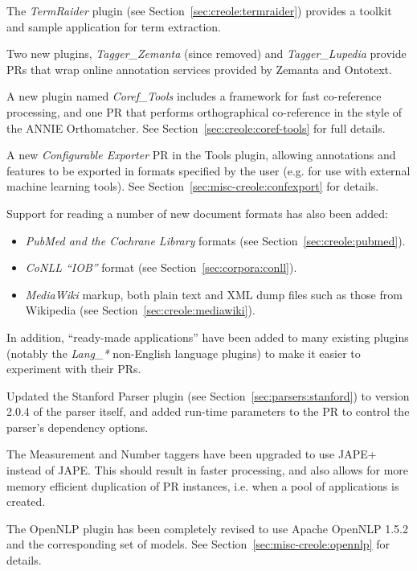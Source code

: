 

The \emph{TermRaider} plugin (see Section~\ref{sec:creole:termraider})
provides a toolkit and sample application for term extraction.

Two new plugins, \emph{Tagger\_Zemanta} (since removed) and
\emph{Tagger\_Lupedia} provide PRs that wrap online annotation services provided
by Zemanta and Ontotext.

A new plugin named \emph{Coref\_Tools} includes a framework for fast
co-reference processing, and one PR that performs orthographical co-reference in
the style of the ANNIE Orthomatcher. See Section~\ref{sec:creole:coref-tools}
for full details.

A new \emph{Configurable Exporter} PR in the Tools plugin, allowing annotations
and features to be exported in formats specified by the user (e.g. for use with
external machine learning tools).  See Section~\ref{sec:misc-creole:confexport}
for details.

Support for reading a number of new document formats has also been added:
\begin{itemize}
\item \emph{PubMed and the Cochrane Library} formats (see
  Section~\ref{sec:creole:pubmed}).
\item \emph{CoNLL ``IOB''} format (see Section~\ref{sec:corpora:conll}).
\item\emph{MediaWiki} markup, both plain text and XML dump files such as those
  from Wikipedia (see Section~\ref{sec:creole:mediawiki}).
\end{itemize}

In addition, ``ready-made applications'' have been added to many existing
plugins (notably the \emph{Lang\_*} non-English language plugins) to make it
easier to experiment with their PRs.


Updated the Stanford Parser plugin (see Section~\ref{sec:parsers:stanford}) to
version 2.0.4 of the parser itself, and added run-time parameters to the PR to
control the parser's dependency options.

The Measurement and Number taggers have been upgraded to use JAPE+ instead of
JAPE.  This should result in faster processing, and also allows for more memory
efficient duplication of PR instances, i.e. when a pool of applications is
created.

The OpenNLP plugin has been completely revised to use Apache OpenNLP 1.5.2 and
the corresponding set of models.  See Section~\ref{sec:misc-creole:opennlp} for
details.

